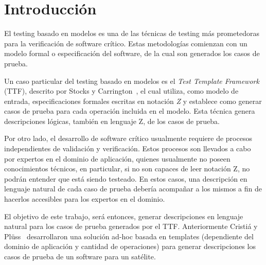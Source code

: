 \chapter{Introducción}
\label{introduccion}

El testing basado en modelos es una de las técnicas de testing más prometedoras para la verificación de software crítico. Estas metodologías comienzan con un modelo formal o especificación del software, de la cual son generados los casos de prueba.

Un caso particular del testing basado en modelos es el \emph{Test Template Framework} (TTF), descrito por Stocks y Carrington~\cite{stocks}, el cual utiliza, como modelo de entrada, especificaciones formales escritas en notación \emph{Z} y establece como generar casos de prueba para cada operación incluida en el modelo. Esta técnica genera descripciones lógicas, también en lenguaje Z, de los casos de prueba.

Por otro lado, el desarrollo de software crítico usualmente requiere de procesos independientes de validación y verificación. Estos procesos son llevados a cabo por expertos en el dominio de aplicación, quienes usualmente no poseen conocimientos técnicos, en particular, si no son capaces de leer notación Z, no podrán entender que está siendo testeado. En estos casos, una descripción en lenguaje natural de cada caso de prueba debería acompañar a los mismos a fin de hacerlos accesibles para los expertos en el dominio.

El objetivo de este trabajo, será entonces, generar descripciones en lenguaje natural para los casos de prueba generados por el TTF. Anteriormente Cristiá y Plüss~\cite{cristia_plus} desarrollaron una solución ad-hoc basada en templates (dependiente del dominio de aplicación y cantidad de operaciones) para generar descripciones los casos de prueba de un software para un satélite. 

